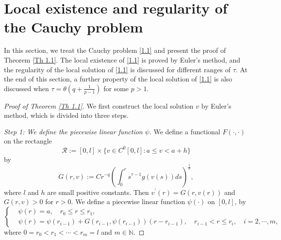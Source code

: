 \documentclass[a4paper,11pt]{amsart}
\theoremstyle{plain}
\theoremstyle{remark}
\numberwithin{equation}{section}
\numberwithin{figure}{section}
\numberwithin{remark}{section}
\begin{document}
\begin{sloppypar}
\vspace{3mm}





\section{Local existence and regularity of the Cauchy problem}\label{Section 2}

\sloppy{}


In this section, we treat the Cauchy problem \eqref{1.1} and present the proof of Theorem \ref{Th 1.1}. The local existence of \eqref{1.1} is proved by Euler's method, and the regularity of the local solution of \eqref{1.1} is discussed for different ranges of $\tau$. At the end of this section, a further property of the local solution of \eqref{1.1} is also discussed when $\tau = \theta (q+\frac{1}{p-1})$ for some $p>1$.


\begin{proof}[Proof of Theorem \ref{Th 1.1}] We first construct the local solution $v$ by Euler's method, which is divided into three steps.

	\textit{Step 1: We define the piecewise linear function $\psi$}.
	We define a functional $F(\cdot, \cdot)$ on the rectangle
	\begin{equation*}
		\mathcal{R}:=[0,l]\times\{v \in C^0[0,l]: a\leq v <a+h\}
	\end{equation*}
	by
	\begin{equation}\label{F def}
		G(r,v):=C  r^{-q}  \left(  \int_{0}^{r} s^{\tau-1} g (v(s))ds \right )^{\frac{1}{\theta}},
	\end{equation}	
	where $l$ and $h$ are small positive constants.
	Then $v^{\prime}(r)=G(r,v(r))$
	and $G(r,v)>0$ for $r>0$.
	We define a piecewise linear function $\psi(\cdot)$ on $[0,l]$, by
	\begin{equation}\label{new aaa}
		\left\{
		\begin{aligned}
			&\psi(r)=a, \quad r_0\leq r\leq r_1,\\
			&\psi(r)=\psi(r_{i-1})+G\left( r_{i-1},\psi(r_{i-1})\right) (r-r_{i-1}), \quad r_{i-1} < r \leq r_i,\quad i=2,\cdots,m,
		\end{aligned}
		\right.
	\end{equation}
	where $0=r_0<r_1<\cdots<r_m=l$ and $m\in \mathbb{N}$.
		

\end{proof}
\end{sloppypar}
\end{document}
